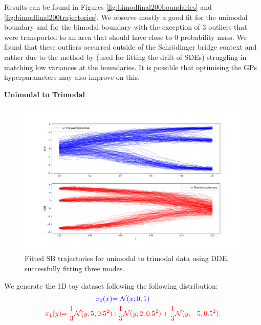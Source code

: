 \documentclass[a4paper,12pt,twoside,openright]{report}
\theoremstyle{definition}
\begin{document}
Results can be found in Figures \ref{fig:bimodfinal200boundaries} and \ref{fig:bimodfinal200trajectories}. We observe mostly a good fit for the unimodal boundary and for the bimodal boundary with the exception of $3$ outliers that were transported to an area that should have close to $0$ probability mass.  
We found that these outliers occurred outside of the Schrödinger bridge context and rather due to the method by \cite{ruttor2013approximate} (used for fitting the drift of SDEs) struggling in matching low variances at the boundaries. It is possible that optimising the GPs hyperparameters may also improve on this. 

\textbf{Unimodal to Trimodal}\\
\begin{figure}[t]
    \centering
    \includegraphics[scale=0.4,trim={2.3cm 1cm 2.5cm 0}, clip]{images/GP/gp_3_mode_200_trimodal_boundaires_trajectories.png}
    \caption{ Fitted SB trajectories for unimodal to trimodal data using DDE, successfully fitting three modes.  }
    \label{fig:3mode1d200trajectroies}
\end{figure}
We generate the 1D toy dataset following the following distribution:
\begin{align*}
     \color{blue}{\pi_0(x)} &\color{blue}{= {\mathcal{N}}(x; 0,  1)} \\
    \color{red}{\pi_1(y)} \color{red}{= \frac{1}{3}{\mathcal{N}}(y; 5, 0.5 ^2)}&\color{red}{ + \frac{1}{3}{\mathcal{N}}(y; 2, 0.5 ^2) + \frac{1}{3}{\mathcal{N}}(y; -5, 0.5 ^2)}.
\end{align*}
\end{document}
